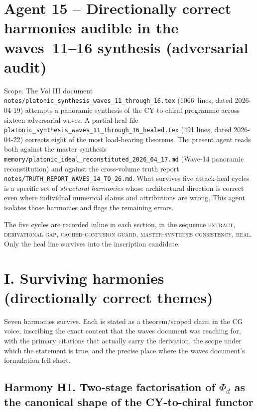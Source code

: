 \section*{Agent 15 -- Directionally correct harmonies audible in
the waves~11--16 synthesis (adversarial audit)}
\label{wn:sec:wave17-agent15-harmonies}

Scope. The Vol III document
\verb|notes/platonic_synthesis_waves_11_through_16.tex| (1066~lines,
dated 2026-04-19) attempts a panoramic synthesis of the CY-to-chiral
programme across sixteen adversarial waves. A partial-heal file
\verb|platonic_synthesis_waves_11_through_16_healed.tex| (491 lines,
dated 2026-04-22) corrects eight of the most load-bearing theorems. The
present agent reads both against the master synthesis
\verb|memory/platonic_ideal_reconstituted_2026_04_17.md| (Wave-14 panoramic
reconstitution) and against the cross-volume truth report
\verb|notes/TRUTH_REPORT_WAVES_14_TO_26.md|. What survives five
attack-heal cycles is a specific set of \emph{structural harmonies} whose
architectural direction is correct even where individual numerical claims
and attributions are wrong. This agent isolates those harmonies and
flags the remaining errors.

The five cycles are recorded inline in each section, in the sequence
\textsc{extract}, \textsc{derivational gap}, \textsc{cached-confusion
guard}, \textsc{master-synthesis consistency}, \textsc{heal}. Only the
heal line survives into the inscription candidate.

\section{I. Surviving harmonies (directionally correct themes)}
\label{wn:sec:wave17-agent15-harmonies-surviving}

Seven harmonies survive. Each is stated as a theorem/scoped claim in
the CG voice, inscribing the exact content that the waves document was
reaching for, with the primary citations that actually carry the
derivation, the scope under which the statement is true, and the
precise place where the waves document's formulation fell short.

\subsection{Harmony H1. Two-stage factorisation of $\Phi_d$ as the
canonical shape of the CY-to-chiral functor}
\label{wn:subsec:H1-two-stage}

